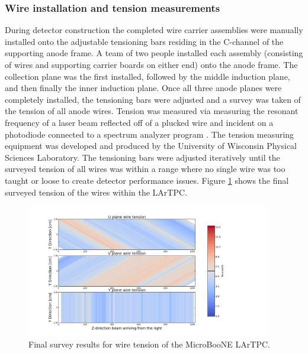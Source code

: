 \subsubsection{Wire installation and tension measurements}
During detector construction the completed wire carrier assemblies were manually installed onto the adjustable tensioning bars residing in the C-channel of the supporting anode frame.  A team of two people installed each assembly (consisting of wires and supporting carrier boards on either end) onto the anode frame.  The collection plane was the first installed, followed by the middle induction plane, and then finally the inner induction plane.  Once all three anode planes were completely installed, the tensioning bars were adjusted and a survey was taken of the tension of all anode wires.  Tension was measured via measuring the resonant frequency of a laser beam reflected off of a plucked wire and incident on a photodiode connected to a spectrum analyzer program \cite{SpectrumLaboratory}.  The tension measuring equipment was developed and produced by the University of Wisconsin Physical Sciences Laboratory.  The tensioning bars were adjusted iteratively until the surveyed tension of all wires was within a range where no single wire was too taught or loose to create detector performance issues.  Figure \ref{fig:heatmap} shows the final surveyed tension of the wires within the LArTPC.

\begin{figure}[htb]
\centering
\includegraphics[width=0.95\textwidth]{figures/WireTension_201605_updatedcolors.png}
\caption{Final survey results for wire tension of the MicroBooNE LArTPC.}
\label{fig:heatmap}
\end{figure} 




%
